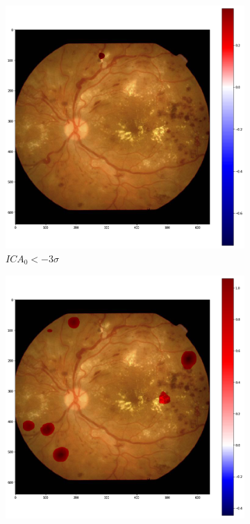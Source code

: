 \documentclass[review]{elsarticle}
\theoremstyle{definition} %
\theoremstyle{remark}
\begin{document}
\begin{figure}[h!]
	\centering
	\begin{subfigure}[b]{0.32\textwidth}
		\centering
		\includegraphics[width=\textwidth]{./figures/ica_retine_maps/G3-P4/m20.png}
		\caption{$ICA_0 < - 3 \sigma$}	
	\end{subfigure}
	\begin{subfigure}[b]{0.32\textwidth}
		\centering
		\includegraphics[width=\textwidth]{./figures/ica_retine_maps/G3-P4/m21.png}

\end{subfigure}
\end{figure}
\end{document}
